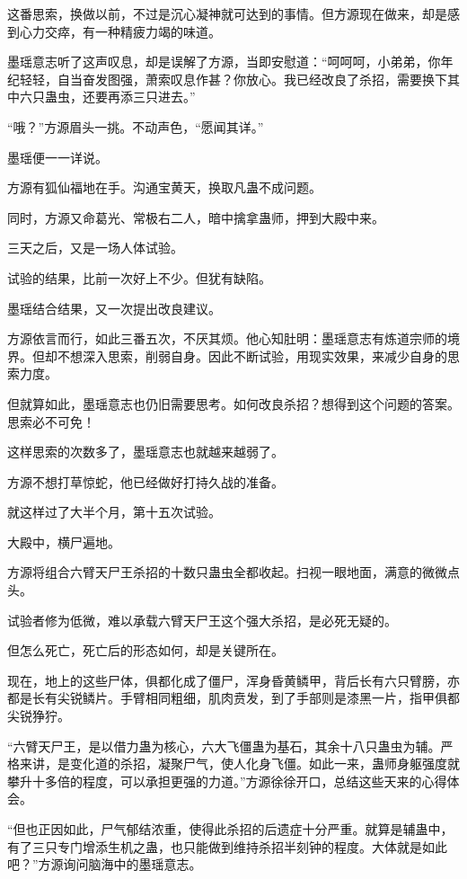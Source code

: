 \begin{this_body}
这番思索，换做以前，不过是沉心凝神就可达到的事情。但方源现在做来，却是感到心力交瘁，有一种精疲力竭的味道。

墨瑶意志听了这声叹息，却是误解了方源，当即安慰道：“呵呵呵，小弟弟，你年纪轻轻，自当奋发图强，萧索叹息作甚？你放心。我已经改良了杀招，需要换下其中六只蛊虫，还要再添三只进去。”

“哦？”方源眉头一挑。不动声色，“愿闻其详。”

墨瑶便一一详说。

方源有狐仙福地在手。沟通宝黄天，换取凡蛊不成问题。

同时，方源又命葛光、常极右二人，暗中擒拿蛊师，押到大殿中来。

三天之后，又是一场人体试验。

试验的结果，比前一次好上不少。但犹有缺陷。

墨瑶结合结果，又一次提出改良建议。

方源依言而行，如此三番五次，不厌其烦。他心知肚明：墨瑶意志有炼道宗师的境界。但却不想深入思索，削弱自身。因此不断试验，用现实效果，来减少自身的思索力度。

但就算如此，墨瑶意志也仍旧需要思考。如何改良杀招？想得到这个问题的答案。思索必不可免！

这样思索的次数多了，墨瑶意志也就越来越弱了。

方源不想打草惊蛇，他已经做好打持久战的准备。

就这样过了大半个月，第十五次试验。

大殿中，横尸遍地。

方源将组合六臂天尸王杀招的十数只蛊虫全都收起。扫视一眼地面，满意的微微点头。

试验者修为低微，难以承载六臂天尸王这个强大杀招，是必死无疑的。

但怎么死亡，死亡后的形态如何，却是关键所在。

现在，地上的这些尸体，俱都化成了僵尸，浑身昏黄鳞甲，背后长有六只臂膀，亦都是长有尖锐鳞片。手臂相同粗细，肌肉贲发，到了手部则是漆黑一片，指甲俱都尖锐狰狞。

“六臂天尸王，是以借力蛊为核心，六大飞僵蛊为基石，其余十八只蛊虫为辅。严格来讲，是变化道的杀招，凝聚尸气，使人化身飞僵。如此一来，蛊师身躯强度就攀升十多倍的程度，可以承担更强的力道。”方源徐徐开口，总结这些天来的心得体会。

“但也正因如此，尸气郁结浓重，使得此杀招的后遗症十分严重。就算是辅蛊中，有了三只专门增添生机之蛊，也只能做到维持杀招半刻钟的程度。大体就是如此吧？”方源询问脑海中的墨瑶意志。


\end{this_body}
